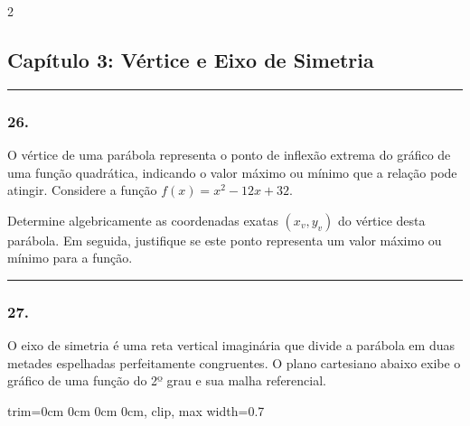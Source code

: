 \documentclass[twoside, 10pt, a4paper]{article}
\newlength{\espacoPosTitulo}
\newlength{\espacoPreQuestao}
\newlength{\espacoQuestao}
\newlength{\larguraTikz}
\begin{document}
\begin{multicols*}{2}
\subsection*{Capítulo 3: Vértice e Eixo de Simetria}
\vspace{-0.2cm}\noindent\rule{\linewidth}{1.5pt} 
\par\vspace{\espacoPosTitulo}
\subsubsection*{26.} O vértice de uma parábola representa o ponto de inflexão extrema do gráfico de uma função quadrática, indicando o valor máximo ou mínimo que a relação pode atingir. Considere a função $f(x) = x^2 - 12x + 32$.

Determine algebricamente as coordenadas exatas $(x_v, y_v)$ do vértice desta parábola. Em seguida, justifique se este ponto representa um valor máximo ou mínimo para a função.
\par\vspace{\espacoQuestao}

\noindent\textcolor{CorLinha}{\rule{\linewidth}{0.5pt}} 
\par\vspace{\espacoPreQuestao}
\subsubsection*{27.} O eixo de simetria é uma reta vertical imaginária que divide a parábola em duas metades espelhadas perfeitamente congruentes. O plano cartesiano abaixo exibe o gráfico de uma função do 2º grau e sua malha referencial.

\begin{center}
\begin{adjustbox}{trim=0cm 0cm 0cm 0cm, clip, max width=0.7\linewidth}
\end{adjustbox}
\end{center}
\end{multicols*}
\end{document}
